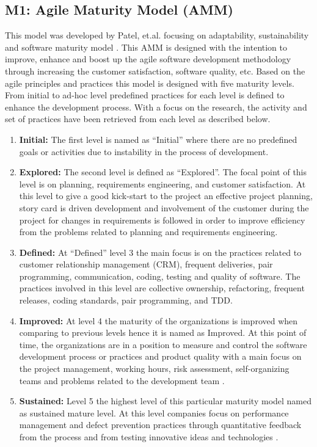 \documentclass[a4paper,oneside]{bth}
\begin{document}
\subsection{M1: Agile Maturity Model (AMM)}
This model was developed by Patel, et.al. focusing on adaptability, sustainability and software maturity model \cite{patel_agile_2009}. This AMM is designed with the intention to improve, enhance and boost up the agile software development methodology through increasing the customer satisfaction, software quality, etc. Based on the agile principles and practices this model is designed with five maturity levels. From initial to ad-hoc level predefined practices for each level is defined to enhance the development process. With a focus on the research, the activity and set of practices have been retrieved from each level as described below.
\begin{enumerate}
\item \textbf{Initial:} The first level is named as “Initial” where there are no predefined goals or activities due to instability in the process of development.
\item \textbf{Explored:} The second level is defined as “Explored”. The focal point of this level is on planning, requirements engineering, and customer satisfaction. At this level to give a good kick-start to the project an effective project planning, story card is driven development and involvement of the customer during the project for changes in requirements is followed in order to improve efficiency from the problems related to planning and requirements engineering.
\item \textbf{Defined:} At “Defined” level 3 the main focus is on the practices related to customer relationship management (CRM), frequent deliveries, pair programming, communication, coding, testing and quality of software\cite{patel_agile_2009}. The practices involved in this level are collective ownership, refactoring, frequent releases, coding standards, pair programming, and TDD.
\item \textbf{Improved:} At level 4 the maturity of the organizations is improved when comparing to previous levels hence it is named as Improved. At this point of time, the organizations are in a position to measure and control the software development process or practices and product quality with a main focus on the project management, working hours, risk assessment, self-organizing teams and problems related to the development team \cite{patel_agile_2009}.
\item \textbf{Sustained:} Level 5 the highest level of this particular maturity model named as sustained mature level. At this level companies focus on performance management and defect prevention practices through quantitative feedback from the process and from testing innovative ideas and technologies \cite{patel_agile_2009}.
\end{enumerate}
\end{document}
